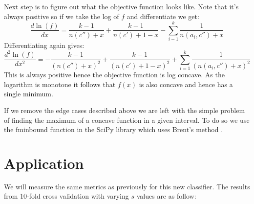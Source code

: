 Next step is to figure out what the objective function looks like.
Note that it's always positive so if we take the log of $f$ and differentiate we get:
\begin{equation}
	\frac{d\ln(f)}{dx} = \frac{k-1}{n(c'')+x} + \frac{k-1}{n(c')+1-x} - \sum_{i-1}^k \frac{1}{n(a_i, c'') + x}
\end{equation}
Differentiating again gives:
\begin{equation}
	\frac{d^2\ln(f)}{dx^2} = -\frac{k-1}{(n(c'') + x)^2} + \frac{k-1}{(n(c')+1-x)^2} + \sum_{i=1}^k \frac{1}{(n(a_i, c'') + x)^2}
\end{equation}
This is always positive hence the objective function is log concave.
As the logarithm is monotone it follows that $f(x)$ is also concave and hence has a single minimum.

If we remove the edge cases described above we are left with the simple problem of finding the maximum of a concave function in a given interval.
To do so we use the fminbound function in the SciPy library which uses Brent's method \cite{fminbound}.


\section{Application}

We will measure the same metrics as previously for this new classifier.
The results from 10-fold cross validation with varying $s$ values are as follow:

